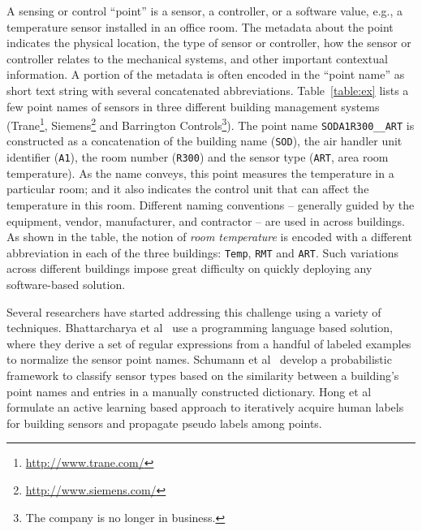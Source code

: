 A sensing or control ``point'' is a sensor,
a controller, or a software value, e.g., a temperature sensor
installed in an office room. The metadata about the point indicates the physical
location, the type of sensor or controller, how the sensor or controller relates
to the mechanical systems, and other important contextual information. A portion of
the metadata is often encoded in the
``point name'' as short
text string with several concatenated abbreviations. Table~\ref{table:ex} lists 
a few point names of sensors in three different building management systems 
(Trane\footnote{\url{http://www.trane.com/}}, Siemens\footnote{\url{http://www.siemens.com/}} 
and Barrington Controls\footnote{The company is no longer in business.}). 
The point name \texttt{SODA1R300\_\_ART} is constructed as a
concatenation of the building name (\texttt{SOD}), the air handler unit
identifier (\texttt{A1}), the room number (\texttt{R300}) and the sensor type
(\texttt{ART}, area room temperature). As the name conveys, this point measures 
the temperature in a particular room; and it also indicates the control unit that 
can affect the temperature in this room. Different naming conventions -- 
generally guided by the equipment, vendor, manufacturer, 
and contractor --
are used in across buildings. As shown in the table, the notion of {\em room temperature} is encoded 
with a different abbreviation in each of the three buildings: \texttt{Temp}, \texttt{RMT} and \texttt{ART}.
Such variations across different buildings impose great difficulty on quickly deploying any software-based
solution.

Several researchers have started addressing this challenge using a variety of techniques.
Bhattarcharya et al~\cite{arka} use a programming language based solution, 
where they derive a set of regular expressions from a handful of labeled examples 
to normalize the sensor point names. 
Schumann et al~\cite{ibm} develop a probabilistic framework to classify sensor types 
based on the similarity between a building's point names and entries in a manually constructed dictionary. 
Hong et al~\cite{cikm} formulate an active learning based approach to iteratively 
acquire human labels for building sensors and propagate pseudo labels among points.

